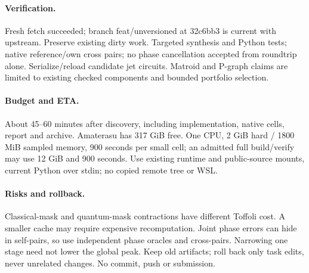 \documentclass{article}
\begin{document}
\paragraph{Verification.} Fresh fetch succeeded; branch feat/unversioned at
32c6bb3 is current with upstream. Preserve existing dirty work. Targeted synthesis
and Python tests; native reference/own cross pairs; no phase cancellation accepted
from roundtrip alone. Serialize/reload candidate jet circuits. Matroid and P-graph
claims are limited to existing checked components and bounded portfolio selection.
\paragraph{Budget and ETA.} About 45--60 minutes after discovery, including
implementation, native cells, report and archive. Amaterasu has 317 GiB free.
One CPU, 2 GiB hard / 1800 MiB sampled memory, 900 seconds per small cell; an
admitted full build/verify may use 12 GiB and 900 seconds. Use existing runtime
and public-source mounts, current Python over stdin; no copied remote tree or WSL.
\paragraph{Risks and rollback.} Classical-mask and quantum-mask contractions
have different Toffoli cost. A smaller cache may require expensive recomputation.
Joint phase errors can hide in self-pairs, so use independent phase oracles and
cross-pairs. Narrowing one stage need not lower the global peak. Keep old artifacts;
roll back only task edits, never unrelated changes. No commit, push or submission.
\begin{center}\end{center}
\end{document}
